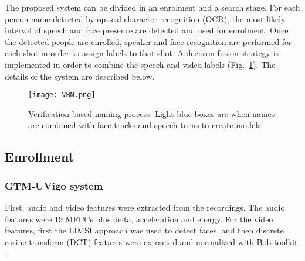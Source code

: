 The proposed system can be divided in an enrolment and a search stage. For each person name detected by optical character recognition (OCR), the most likely interval
of speech and face presence are detected and used for enrolment.
Once the detected people are enrolled, speaker and face recognition
are performed for each shot in order to assign labels to that shot. 
A decision fusion strategy is implemented in order to combine the speech and video labels (Fig.~\ref{fig:vbn}). The details of the system
are described below.

\begin{figure}[!htb]
 \centering
 \texttt{[image: VBN.png]}
\vspace*{-5mm}
 \caption{Verification-based naming process. Light blue boxes are when names are combined with face tracks and speech turns to create  models.}
\vspace*{-5mm}
 \label{fig:vbn}
\end{figure}

\subsection{Enrollment}

\subsubsection{GTM-UVigo system}
First, audio and video features were extracted from the recordings. The audio features were 19 MFCCs plus delta, acceleration and energy. For the video features, first
the LIMSI approach was used to detect faces, and then discrete cosine transform (DCT) features were extracted and normalized with Bob toolkit \cite{bob2012}.

